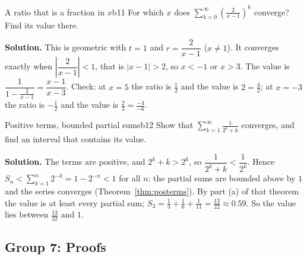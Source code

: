 \documentclass[11pt]{article}
\begin{document}
\begin{exmp}{A ratio that is a fraction in $x$}{b11}
For which $x$ does $\displaystyle\sum_{k=0}^\infty\left(\frac2{x-1}\right)^k$ converge? Find its value there.

\textbf{Solution.} This is geometric with $t=1$ and $r=\dfrac2{x-1}$ ($x\ne1$). It converges exactly when $\left|\dfrac2{x-1}\right|<1$, that is $|x-1|>2$, so $x<-1$ or $x>3$. The value is $\dfrac1{1-\frac2{x-1}}=\dfrac{x-1}{x-3}$. Check: at $x=5$ the ratio is $\frac12$ and the value is $2=\frac{4}{2}$; at $x=-3$ the ratio is $-\frac12$ and the value is $\frac23=\frac{-4}{-6}$.
\end{exmp}

\begin{exmp}{Positive terms, bounded partial sums}{b12}
Show that $\displaystyle\sum_{k=1}^\infty\frac1{2^k+k}$ converges, and find an interval that contains its value.

\textbf{Solution.} The terms are positive, and $2^k+k>2^k$, so $\dfrac1{2^k+k}<\dfrac1{2^k}$. Hence $S_n<\sum_{k=1}^n2^{-k}=1-2^{-n}<1$ for all $n$: the partial sums are bounded above by $1$ and the series converges (Theorem~\ref{thm:posterms}). By part (a) of that theorem the value is at least every partial sum; $S_3=\frac13+\frac16+\frac1{11}=\frac{13}{22}\approx0.59$. So the value lies between $\frac{13}{22}$ and $1$.
\end{exmp}

\subsection*{Group 7: Proofs}
\end{document}
